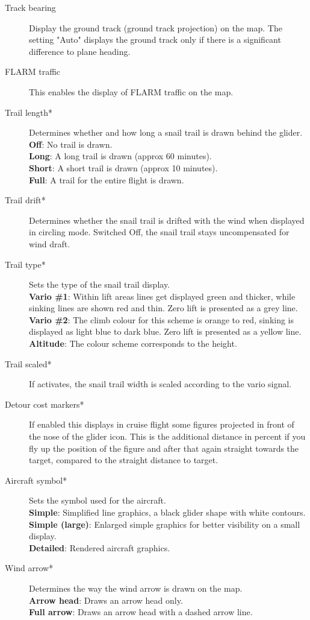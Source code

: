 \begin{description}
\item[Track bearing]  Display the ground track (ground track projection) on the map.
  The setting "Auto" displays the ground track only if there is a significant 
  difference to plane heading.
\item[FLARM traffic]  \label{conf:flarm-on-map} This enables the display of FLARM 
  traffic on the map.
\item[Trail length*] \label{conf:snailtrail} Determines whether and how long a
  snail trail is drawn behind the glider. \\
  {\bf Off}: No trail is drawn. \\
  {\bf Long}: A long trail is drawn (approx 60 minutes). \\
  {\bf Short}: A short trail is drawn (approx 10 minutes). \\
  {\bf Full}: A trail for the entire flight is drawn.
\item[Trail drift*] \label{conf:traildrift} Determines whether the
  snail trail is drifted with the wind when displayed in circling mode.  Switched Off,
  the snail trail stays uncompensated for wind draft.
\item[Trail type*] \label{conf:snailtype} Sets the type of the snail trail display. \\
  {\bf Vario \#1}: Within lift areas lines get displayed green and
  thicker, while sinking lines are shown red and thin.  Zero lift
  is presented as a grey line. \\
  {\bf Vario \#2}: The climb colour for this scheme is orange to red, sinking is
  displayed as light blue to dark blue. Zero lift is presented as a yellow line. \\
  {\bf Altitude}: The colour scheme corresponds to the height.
\item[Trail scaled*] \label{conf:trailscaled} If activates, the snail trail width 
  is scaled according to the vario signal.
\item[Detour cost markers*]  If enabled this displays in cruise flight some
  figures projected in front of the nose of the glider icon.  This is the
  additional distance in percent if you fly up the position of the figure and
  after that again straight towards the target, compared to the straight distance
  to target.
\item[Aircraft symbol*]  Sets the symbol used for the aircraft. \\
  {\bf Simple}: Simplified line graphics, a black glider shape with white contours. \\
  {\bf Simple (large)}: Enlarged simple graphics for better visibility on a small display. \\
  {\bf Detailed}: Rendered aircraft graphics.
\item[Wind arrow*]  Determines the way the wind arrow is drawn on the map. \\
  {\bf Arrow head}: Draws an arrow head only. \\
  {\bf Full arrow}: Draws an arrow head with a dashed arrow line.
\end{description}


